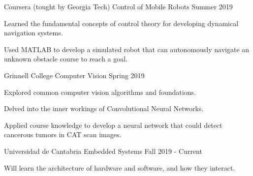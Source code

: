 \documentclass[12pt, a4paper]{awesome-cv}
\begin{document}
\begin{cventries}

    \cventry
	{Coursera (tought by Georgia Tech)}
	{Control of Mobile Robots}
	{}
	{Summer 2019}
	{
	  \begin{cvitems}
		\item{Learned the fundamental concepts of control theory for developing dynamical navigation systems.}
		\item{Used MATLAB to develop a simulated robot that can autonomously navigate an unknown obstacle course to reach a goal.}
	  \end{cvitems}
	}

    \cventry
	{Grinnell College}
	{Computer Vision}
	{}
	{Spring 2019}
	{
	  \begin{cvitems}
		\item{Explored common computer vision algorithms and foundations.}
		\item{Delved into the inner workings of Convolutional Neural Networks.}
		\item{Applied course knowledge to develop a neural network that could detect cancerous tumors in CAT scan images.}
	  \end{cvitems}
	}

    \cventry
	{Universidad de Cantabria}
	{Embedded Systems}
	{}
	{Fall 2019 - Current}
	{
	  \begin{cvitems}
		\item{Will learn the architecture of hardware and software, and how they interact.}
	  \end{cvitems}
	}

\end{cventries}

%
\end{document}
